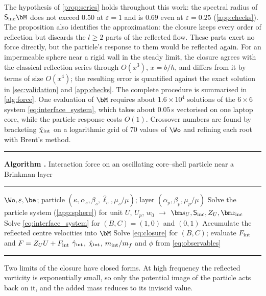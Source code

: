 The hypothesis of \cref{prop:series} holds throughout this work: the spectral radius of $\mathsf S_{\rm inc}\bM$ does not
exceed $0.50$ at $\varepsilon=1$ and is $0.69$ even at $\varepsilon=0.25$ (\cref{app:checks}). The proposition also
identifies the approximation: the closure keeps every order of reflection but discards the $l\ge2$ parts of the
reflected flow. These parts exert no force directly, but the particle's response to them would be reflected again. For
an impermeable sphere near a rigid wall in the steady limit, the closure agrees with the classical reflection series
through $O(x^3)$, $x=b/h$, and differs from it by terms of size $O(x^4)$; the resulting error is quantified against the
exact solution in \cref{sec:validation} and \cref{app:checks}. The complete procedure is summarised in
\cref{alg:force}. One evaluation of $\bM$ requires about $1.6\times10^4$ solutions of the $6\times6$ system
\eqref{eq:interface_system}, which takes about $0.05$\,s vectorised on one laptop core, while the particle response costs
$O(1)$. Crossover numbers are found by bracketing $\hat\chi_{\rm int}$ on a logarithmic grid of 70 values of $\Wo$ and
refining each root with Brent's method.

\begin{center}\begin{minipage}{\linewidth}\small
\hrule\smallskip
{}\label{alg:force}%
\noindent\textbf{Algorithm \thealgorithm.} Interaction force on an oscillating core--shell particle near a Brinkman layer
\smallskip\hrule\smallskip
\begin{algorithmic}[1]
\Require $\Wo,\varepsilon,\be$; particle $(\kappa,\alpha_s,\beta_s,\hat\ell_c,\mu_s/\mu)$; layer $(\alpha_p,\beta_p,\mu_p/\mu)$
\State Solve the particle system (\cref{app:sphere}) for unit $U$, $U_p$, $w_0$ $\to$ $\bm s_U,\mathsf S_{\rm inc},Z_U,\bm z_{\rm inc}$
 
  \State Solve \cref{eq:interface_system} for $(B,C)=(1,0)$ and $(0,1)$
  \State Accumulate the reflected centre velocities into $\bM$
\EndFor
\State Solve \cref{eq:closure} for $(B,C)$; evaluate $F_{\rm int}$ and $F=Z_UU+F_{\rm int}$
\State \Return $\hat\gamma_{\rm int}$, $\hat\chi_{\rm int}$, $m_{\rm int}/m_f$ and $\phi$ from \cref{eq:observables}
\end{algorithmic}
\smallskip\hrule
\end{minipage}\end{center}

Two limits of the closure have closed forms. At high frequency the reflected vorticity is exponentially small, so only
the potential image of the particle acts back on it, and the added mass reduces to its inviscid value.

